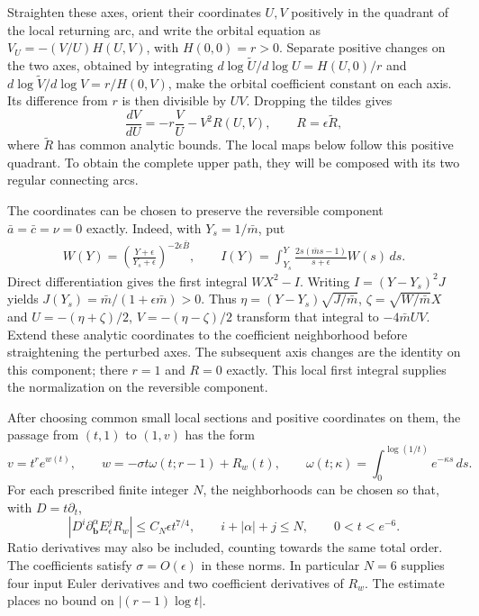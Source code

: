 Straighten these axes, orient their coordinates $U,V$ positively in the
quadrant of the local returning arc, and write the orbital equation as
$V_U=-(V/U)H(U,V)$, with $H(0,0)=r>0$. Separate positive changes on the
two axes, obtained by integrating
$d\log\widetilde U/d\log U=H(U,0)/r$ and
$d\log\widetilde V/d\log V=r/H(0,V)$, make the orbital coefficient
constant on each axis. Its difference from $r$ is then divisible by
$UV$. Dropping the tildes gives
\begin{equation}\label{rw:upper:axis-equation}
 \frac{dV}{dU}=-r\frac VU-V^2R(U,V),\qquad R=\epsilon\widetilde R,
\end{equation}
where $\widetilde R$ has common analytic bounds.  The local maps below
follow this positive quadrant.  To obtain the complete upper path,
they will be composed with its two regular connecting arcs.

The coordinates can be chosen to preserve the reversible component
$\bar a=\bar c=\nu=0$ exactly. Indeed, with $Y_s=1/\bar m$, put
\begin{gather*}
 W(Y)=\left(\frac{Y+\epsilon}{Y_s+\epsilon}\right)^{-2\epsilon\bar B},
 \qquad
 I(Y)=\int_{Y_s}^Y\frac{2s(\bar ms-1)}{s+\epsilon}W(s)\,ds.
\end{gather*}
Direct differentiation gives the first integral $WX^2-I$.
Writing $I=(Y-Y_s)^2J$ yields
$J(Y_s)=\bar m/(1+\epsilon\bar m)>0$. Thus
$\eta=(Y-Y_s)\sqrt{J/\bar m}$,
$\zeta=\sqrt{W/\bar m}X$ and
$U=-(\eta+\zeta)/2$, $V=-(\eta-\zeta)/2$ transform that integral to
$-4\bar mUV$. Extend these analytic coordinates to the coefficient
neighborhood before straightening the perturbed axes. The subsequent
axis changes are the identity on this component; there $r=1$ and
$R=0$ exactly.  This local first integral supplies the normalization
on the reversible component.

\begin{proposition}\label{rw:upper:prepared-map}
After choosing common small local sections and positive coordinates on
them, the passage from $(t,1)$ to $(1,v)$ has the form
\begin{equation}\label{rw:upper:comp-map}
 v=t^r e^{w(t)},\qquad
 w=-\sigma t\omega(t;r-1)+R_w(t),\qquad
 \omega(t;\kappa)=\int_0^{\log(1/t)}e^{-\kappa s}\,ds.
\end{equation}
For each prescribed finite integer $N$, the neighborhoods can be chosen
so that, with $D=t\partial_t$,
\begin{equation}\label{rw:upper:remainder}
 |D^i\partial_{\mathbf b}^{\alpha}E_\epsilon^jR_w|
 \le C_N\epsilon t^{7/4},\qquad i+|\alpha|+j\le N,
 \qquad 0<t<e^{-6}.
\end{equation}
Ratio derivatives may also be included, counting towards the same total
order. The coefficients satisfy $\sigma=O(\epsilon)$ in these norms.
In particular $N=6$ supplies four input Euler derivatives and two
coefficient derivatives of $R_w$. The estimate places no bound on
$|(r-1)\log t|$.
\end{proposition}


